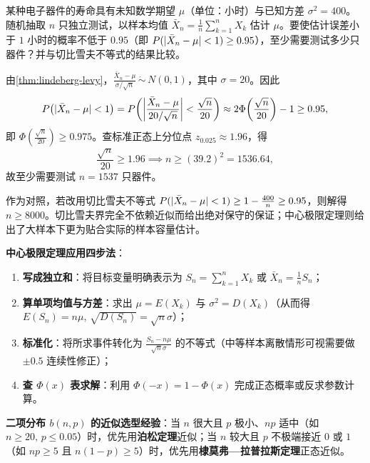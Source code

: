 \begin{example}[title={由精度与置信度反求样本容量}]
\label{eg:sample-size-clt}
某种电子器件的寿命具有未知数学期望 $\mu$（单位：小时）与已知方差 $\sigma^2=400$。随机抽取 $n$ 只独立测试，以样本均值 $\bar{X}_n=\frac{1}{n}\sum_{k=1}^{n}X_k$ 估计 $\mu$。要使估计误差小于 $1$ 小时的概率不低于 $0.95$（即 $P(\lvert\bar{X}_n-\mu\rvert<1)\ge 0.95$），至少需要测试多少只器件？并与切比雪夫不等式的结果比较。
\begin{solution}
由\cref{thm:lindeberg-levy}，$\frac{\bar{X}_n-\mu}{\sigma/\sqrt{n}}\,\dot{\sim}\,N(0,1)$，其中 $\sigma=20$。因此
\[
  P\bigl(\lvert\bar{X}_n-\mu\rvert<1\bigr)
  =P\!\left(\left|\frac{\bar{X}_n-\mu}{20/\sqrt{n}}\right|<\frac{\sqrt{n}}{20}\right)
  \approx 2\Phi\!\left(\frac{\sqrt{n}}{20}\right)-1\ge 0.95,
\]
即 $\Phi\!\left(\frac{\sqrt{n}}{20}\right)\ge 0.975$。查标准正态上分位点 $z_{0.025}\approx 1.96$，得
\[
  \frac{\sqrt{n}}{20}\ge 1.96 \implies n\ge (39.2)^2=1536.64,
\]
故至少需要测试 $n=1537$ 只器件。

作为对照，若改用切比雪夫不等式 $P(\lvert\bar{X}_n-\mu\rvert<1)\ge 1-\frac{400}{n}\ge 0.95$，则解得 $n\ge 8000$。切比雪夫界完全不依赖近似而给出绝对保守的保证；中心极限定理则给出了大样本下更为贴合实际的样本容量估计。
\end{solution}
\end{example}

\begin{method}[中心极限定理四步法与二项分布近似选型]
\textbf{中心极限定理应用四步法}：
\begin{enumerate}
  \item \textbf{写成独立和}：将目标变量明确表示为 $S_n=\sum_{k=1}^{n}X_k$ 或 $\bar{X}_n=\frac{1}{n}S_n$；
  \item \textbf{算单项均值与方差}：求出 $\mu=E(X_k)$ 与 $\sigma^2=D(X_k)$（从而得 $E(S_n)=n\mu,\,\sqrt{D(S_n)}=\sqrt{n}\sigma$）；
  \item \textbf{标准化}：将所求事件转化为 $\frac{S_n-n\mu}{\sqrt{n}\sigma}$ 的不等式（中等样本离散情形可视需要做 $\pm 0.5$ 连续性修正）；
  \item \textbf{查 $\Phi(x)$ 表求解}：利用 $\Phi(-x)=1-\Phi(x)$ 完成正态概率或反求参数计算。
\end{enumerate}

\textbf{二项分布 $b(n,p)$ 的近似选型经验}：当 $n$ 很大且 $p$ 极小、$np$ 适中（如 $n\ge 20,\,p\le 0.05$）时，优先用\textbf{泊松定理}近似；当 $n$ 较大且 $p$ 不极端接近 $0$ 或 $1$（如 $np\ge 5$ 且 $n(1-p)\ge 5$）时，优先用\textbf{棣莫弗—拉普拉斯定理}正态近似。
\end{method}

